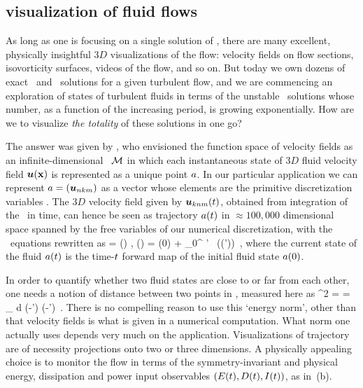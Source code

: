 \documentclass{jfm}
\begin{document}
\subsection{{\StateDsp} visualization of fluid flows}
\label{s:visualStatSp}

As long as one is focusing on a single solution of \NSe, there are many
excellent, physically insightful $3D$ visualizations of the flow:
velocity fields on flow sections, isovorticity surfaces, videos of the
flow, and so on. But today we own dozens of exact \eqv\ and \reqv\
solutions for a given turbulent flow, and we are commencing an exploration of
states of turbulent fluids in terms of the unstable \po\ solutions whose
number, as a function of the increasing period, is growing exponentially.
How are we to visualize \emph{the totality} of these solutions in one go?

The answer was given by \cite{hopf48}, who envisioned the function space
of {\NS} velocity fields as an infinite-dimensional \statesp\ $\pS$ in
which each instantaneous state of $3D$ fluid velocity field $\mbox{\boldmath $u$}({\bf x})$ is
represented as a unique point $a$. In our particular application we
can represent $a = (\mbox{\boldmath $u$}_{nkm})$ as a vector whose elements are the
primitive discretization variables \refeq{pipeDiscr}. The $3D$ velocity
field given by $\mbox{\boldmath $u$}_{knm}(t)$, obtained from integration of the
\NSe\ in time, can hence be seen as trajectory $a(t)$ in
$\approx 100,000$ dimensional space spanned by the free variables of our
numerical discretization, with the \NS\ equations \refeq{NavStokesDev}
rewritten as
\beq
   \dot{\ssp} = \vel(\ssp) ,
   \qquad
   \ssp(\zeit) = \ssp(0)
            + \int_0^\zeit \! \zeit' \, \vel(\ssp(\zeit'))
\,,
where the current state of the fluid $ a(t)$ is the time-$t$
forward map of the initial fluid state  $a(0)$.

In order to quantify whether two fluid states are close to or far from
each other, one needs a notion of distance between two points in
\statesp, measured here as
\beq
  ^2  =  =
\int_\bCell \! d \bx \;
(-\vec{u}') \cdot (-')
\,.
There is no compelling reason to use this {`energy norm'}, other than
that velocity fields is what is given in a numerical computation. What
norm one actually uses depends very much on the application.
Visualizations of trajectory  are of necessity
projections onto two or three dimensions. A physically appealing choice
is to monitor the flow in terms of the
symmetry-invariant and physical energy, dissipation and power input
observables $(E(t),D(t),I(t))$, as in
\,(b).
\end{document}
